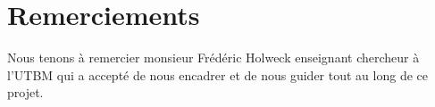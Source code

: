 \chapter*{Remerciements}

Nous tenons à remercier monsieur Frédéric Holweck enseignant chercheur à l'UTBM
qui a accepté de nous encadrer et de nous guider tout au long de ce projet.